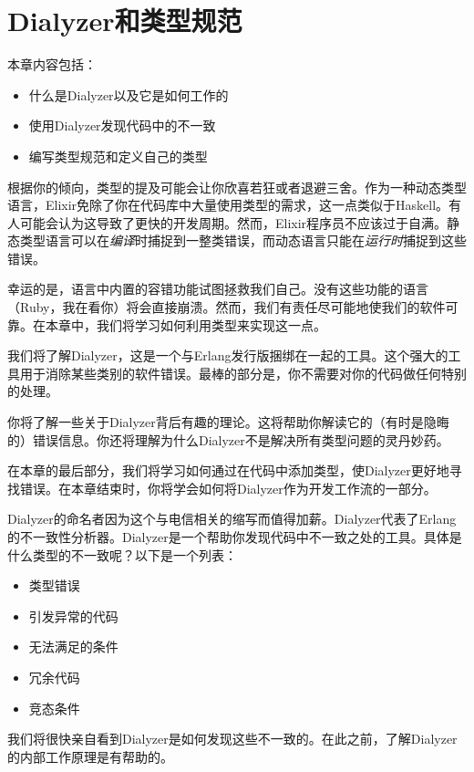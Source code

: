 \chapter{Dialyzer和类型规范}\label{chapt:dialyzer}

本章内容包括：

\begin{itemize}

\item  什么是Dialyzer以及它是如何工作的
\item  使用Dialyzer发现代码中的不一致
\item  编写类型规范和定义自己的类型
\end{itemize}

根据你的倾向，类型的提及可能会让你欣喜若狂或者退避三舍。作为一种动态类型语言，Elixir免除了你在代码库中大量使用类型的需求，这一点类似于Haskell。有人可能会认为这导致了更快的开发周期。然而，Elixir程序员不应该过于自满。静态类型语言可以在\emph{编译}时捕捉到一整类错误，而动态语言只能在\emph{运行时}捕捉到这些错误。

幸运的是，语言中内置的容错功能试图拯救我们自己。没有这些功能的语言（Ruby，我在看你）将会直接崩溃。然而，我们有责任尽可能地使我们的软件可靠。在本章中，我们将学习如何利用类型来实现这一点。

我们将了解Dialyzer，这是一个与Erlang发行版捆绑在一起的工具。这个强大的工具用于消除某些类别的软件错误。最棒的部分是，你不需要对你的代码做任何特别的处理。

你将了解一些关于Dialyzer背后有趣的理论。这将帮助你解读它的（有时是隐晦的）错误信息。你还将理解为什么Dialyzer不是解决所有类型问题的灵丹妙药。

在本章的最后部分，我们将学习如何通过在代码中添加类型，使Dialyzer更好地寻找错误。在本章结束时，你将学会如何将Dialyzer作为开发工作流的一部分。

Dialyzer的命名者因为这个与电信相关的缩写而值得加薪。Dialyzer代表了Erlang的不一致性分析器。Dialyzer是一个帮助你发现代码中不一致之处的工具。具体是什么类型的不一致呢？以下是一个列表：

\begin{itemize}

\item  类型错误
\item  引发异常的代码
\item  无法满足的条件
\item  冗余代码
\item  竞态条件
\end{itemize}

我们将很快亲自看到Dialyzer是如何发现这些不一致的。在此之前，了解Dialyzer的内部工作原理是有帮助的。


